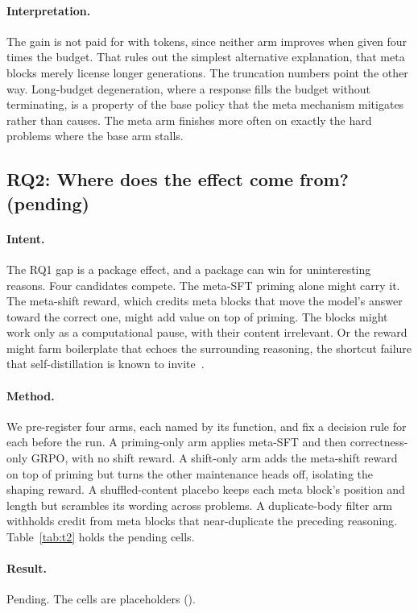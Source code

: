 \paragraph{Interpretation.} The gain is not paid for with tokens, since neither
arm improves when given four times the budget. That rules out the simplest
alternative explanation, that meta blocks merely license longer generations.
The truncation numbers point the other way. Long-budget degeneration, where a
response fills the budget without terminating, is a property of the base policy
that the meta mechanism mitigates rather than causes. The meta arm finishes
more often on exactly the hard problems where the base arm stalls.

\subsection{RQ2: Where does the effect come from? (pending)}
\label{sec:exp:rq2}

\paragraph{Intent.} The RQ1 gap is a package effect, and a package can win for
uninteresting reasons. Four candidates compete. The meta-SFT priming alone
might carry it. The meta-shift reward, which credits meta blocks that move the
model's answer toward the correct one, might add value on top of priming. The
blocks might work only as a computational pause, with their content irrelevant.
Or the reward might farm boilerplate that echoes the surrounding reasoning, the
shortcut failure that self-distillation is known to invite~\citep{shen2026antisd}.

\paragraph{Method.} We pre-register four arms, each named by its function, and
fix a decision rule for each before the run. A priming-only arm applies meta-SFT
and then correctness-only GRPO, with no shift reward. A shift-only arm adds the
meta-shift reward on top of priming but turns the other maintenance heads off,
isolating the shaping reward. A shuffled-content placebo keeps each meta block's
position and length but scrambles its wording across problems. A duplicate-body
filter arm withholds credit from meta blocks that near-duplicate the preceding
reasoning. Table~\ref{tab:t2} holds the pending cells.

\paragraph{Result.} Pending. The cells are placeholders (\todo{}).

